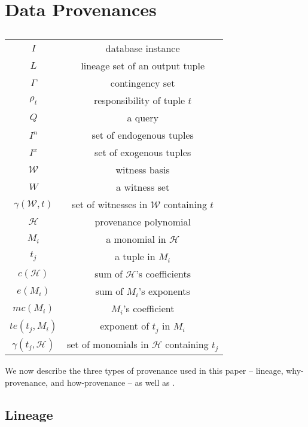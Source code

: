 \section{Data Provenances}
\label{section:preliminaries}

\begin{table}[]
    \centering
    \begin{tabular}{c|c}
    \hline
    	 $I$ & database instance \\
    	 $L$ & lineage set of an output tuple \\
    	 $\Gamma$ & contingency set \\
    	 $\rho_t$ & responsibility of tuple $t$ \\
    	 $Q$ & a query \\
    	 $I^n$ & set of endogenous tuples \\
    	 $I^x$ & set of exogenous tuples \\
    	 $\mathcal{W}$ & witness basis \\
    	 $W$ & a witness set \\
    	 $\gamma(\mathcal{W}, t)$ & set of witnesses in $\mathcal{W}$ containing $t$ \\
         $\mathcal{H}$ & provenance polynomial  \\
         $M_i$ & a monomial in $\mathcal{H}$ \\
         $t_j$ & a tuple in $M_i$ \\
         $c(\mathcal{H})$ & sum of $\mathcal{H}$'s coefficients \\
         $e(M_i)$ & sum of $M_i$'s exponents \\
         $mc(M_i)$ & $M_i$'s coefficient \\
         $te(t_j, M_i)$ & exponent of $t_j$ in $M_i$ \\
         $\gamma(t_j, \mathcal{H})$ & set of monomials in $\mathcal{H}$ containing $t_j$ \\
    \hline
    \end{tabular}
   \caption{}    \label{tab:notation}
\end{table}


We now describe the three types of provenance used in this paper --  lineage, why-provenance, and how-provenance -- as well as
. 

\subsection{Lineage}


